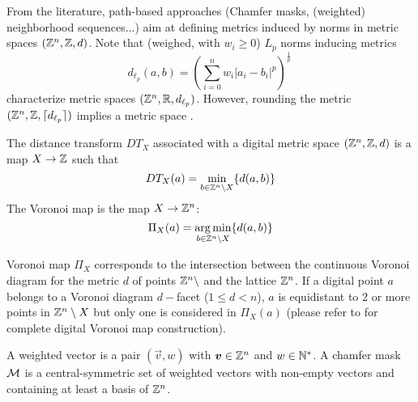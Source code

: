 \documentclass{llncs}
\begin{document}
From the literature, path-based approaches (Chamfer masks, (weighted)
neighborhood sequences...)  aim at defining metrics induced by norms
in metric spaces $({\mathbb{Z}}^n, {\mathbb{Z}} , d)$.  Note that (weighed, with $w_i\geq 0$) $L_p$ norms inducing
metrics
\begin{equation}
    d_{\ell_p} (a,b) = \left ( \sum_{i=0}^n w_i|a_i-b_i |^p \right )^{\frac{1}{p}}\,
  \end{equation}
characterize metric spaces $({\mathbb{Z}}^n, {\mathbb{R}} , d_{\ell_p})$. However,
rounding the metric $({\mathbb{Z}}^n,{\mathbb{Z}}, \lceil d_{\ell_p}\rceil)$ implies a
metric space \cite{klette_book}.

\begin{definition}
  The distance transform $DT_X$ associated with a digital metric space
  $({\mathbb{Z}}^n,{\mathbb{Z}},d)$ is a map  $X\rightarrow{\mathbb{Z}}$ such that
  \begin{equation}
    DT_X(a) = \min_{b\in {\mathbb{Z}}^n\setminus X} \{d(a,b)\}
  \end{equation}
The Voronoi map is the map $X\rightarrow{\mathbb{Z}}^n$:
  \begin{equation}
    \Pi_X(a) = \operatorname*{arg\,min}_{b\in {\mathbb{Z}}^n\setminus X} \{d(a,b)\}
  \end{equation}
\end{definition}
Voronoi map $\Pi_X$ corresponds to the intersection between the
continuous Voronoi diagram for the metric $d$ of points
${\mathbb{Z}}^n\setminus$ and the lattice ${\mathbb{Z}}^n$. If a digital point $a$ belongs
to a Voronoi diagram $d-$facet ($1\leq d< n$), $a$ is equidistant to 2
or more points in ${\mathbb{Z}}^n\setminus X$ but only one is considered in
$\Pi_X(a)$ (please refer to\cite{Couprie2007} for complete digital
Voronoi map construction).

\begin{definition}
  A weighted vector is a pair $(\vec{v},w)$ with $\vec{v}\in\Z^n$ and
  $w\in{\mathbb{N}}^*$. A chamfer mask $\mathcal{M}$ is a central-symmetric set of weighted
  vectors with non-empty vectors and containing at least a basis of
  ${\mathbb{Z}}^n$.
\end{definition}
\end{document}
